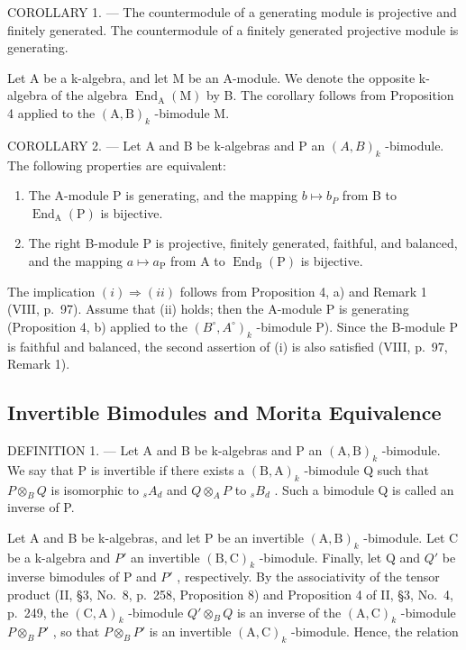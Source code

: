 COROLLARY 1. --- The countermodule of a generating module is projective and finitely generated. The countermodule of a finitely generated projective module is generating.

Let A be a k-algebra, and let M be an A-module. We denote the opposite k-algebra of the algebra \(\operatorname{End}_{\mathrm{A}}(\mathrm{M})\) by B. The corollary follows from Proposition 4 applied to the \((\mathrm{A},\mathrm{B})_{k}\) -bimodule M.

COROLLARY 2. --- Let A and B be k-algebras and P an \((A,B)_{k}\) -bimodule. The following properties are equivalent:

\begin{enumerate}
\def\labelenumi{(\roman{enumi})}
\item
  The A-module P is generating, and the mapping \(b \mapsto b_{P}\) from B to \(\operatorname{End}_{\mathrm{A}}(\mathrm{P})\) is bijective.
\item
  The right B-module P is projective, finitely generated, faithful, and balanced, and the mapping \(a \mapsto a_{\mathrm{P}}\) from A to \(\operatorname{End}_{\mathrm{B}}(\mathrm{P})\) is bijective.
\end{enumerate}

The implication \((i) \Rightarrow (ii)\) follows from Proposition 4, a) and Remark 1 (VIII, p.~97). Assume that (ii) holds; then the A-module P is generating (Proposition 4, b) applied to the \((B^{\circ}, A^{\circ})_{k}\) -bimodule P). Since the B-module P is faithful and balanced, the second assertion of (i) is also satisfied (VIII, p.~97, Remark 1).

\subsection{Invertible Bimodules and Morita Equivalence}

DEFINITION 1. --- Let A and B be k-algebras and P an \((\mathrm{A},\mathrm{B})_{k}\) -bimodule. We say that P is invertible if there exists a \((\mathrm{B},\mathrm{A})_{k}\) -bimodule Q such that \(P \otimes_{B} Q\) is isomorphic to \(_{s}A_{d}\) and \(Q \otimes_{A} P\) to \(_{s}B_{d}\) . Such a bimodule Q is called an inverse of P.

Let A and B be k-algebras, and let P be an invertible \((\mathrm{A},\mathrm{B})_{k}\) -bimodule. Let C be a k-algebra and \(P'\) an invertible \((\mathrm{B},\mathrm{C})_{k}\) -bimodule. Finally, let Q and \(Q'\) be inverse bimodules of P and \(P'\) , respectively. By the associativity of the tensor product (II, §3, No.~8, p.~258, Proposition 8) and Proposition 4 of II, §3, No.~4, p.~249, the \((\mathrm{C},\mathrm{A})_{k}\) -bimodule \(Q'\otimes_{B}Q\) is an inverse of the \((\mathrm{A},\mathrm{C})_{k}\) -bimodule \(P\otimes_{B}P'\) , so that \(P\otimes_{B}P'\) is an invertible \((\mathrm{A},\mathrm{C})_{k}\) -bimodule. Hence, the relation

